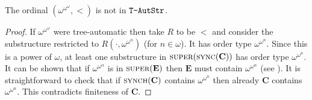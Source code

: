 %

%
%
%
%

\begin{corollary} \label{AS:cor:omomom}
The ordinal $(\omega^{\omega^{\omega}},<)$ is not in $\mbox{\tt T-AutStr}$.
\end{corollary}

\begin{proof}
If $\omega^{\omega^{\omega}}$ were tree-automatic then take $R$ to be $<$ and consider the substructure restricted to $R(\cdot,\omega^{\omega^n})$ (for $n \in \omega$). It has order type $\omega^{\omega^n}$. Since this is a power of $\omega$, at least one substructure in $\textsc{super}(\textsc{sync}(\mathbf{C}))$ has order type $\omega^{\omega^n}$. It can be shown that if $\omega^{\omega^{\alpha}}$ is in $\textsc{super}(\mathbf{E})$ then $\mathbf{E}$ must contain $\omega^{\omega^{\alpha}}$ (see \cite[Remark $8$]{Delh06}). It is straightforward to check that if 
$\textsc{synch}(\mathbf{C})$ contains $\omega^{\omega^n}$ then already $\mathbf{C}$ contains $\omega^{\omega^n}$. This contradicts finiteness of $\mathbf{C}$.
\end{proof}





